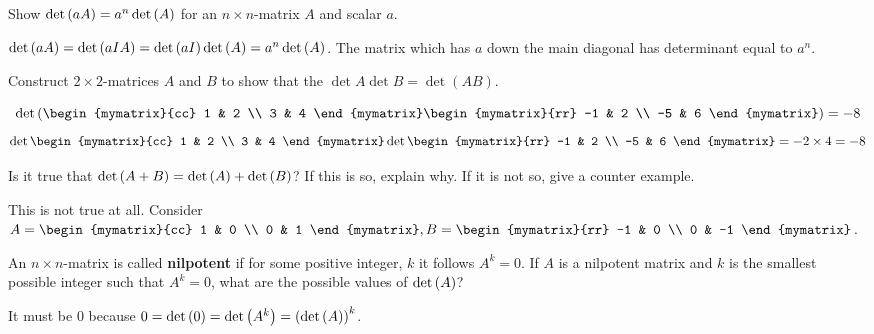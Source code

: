 \begin{enumialphparenastyle}
\begin{ex} Show $\det \left(aA\right) =a^{n}\det \left(A\right) $ for an $n \times n $-matrix $A
$ and scalar $a$. 
\begin{sol}
$\det \left(aA\right) =\det
\left(aIA\right) =\det \left(aI\right) \det \left(A\right) =a^{n}\det
\left(A\right)$. The matrix which has $a$ down the main diagonal has
determinant equal to $a^{n}$.
\end{sol}
\end{ex}


\begin{ex} Construct $2\times 2$-matrices $A$ and $B$ to show that the
$\det A \det B = \det (AB)$. 
\begin{sol}
\begin{equation*}
\det
\tup{\begin{mymatrix}{cc}
1 & 2 \\
3 & 4
\end{mymatrix} \begin{mymatrix}{rr}
-1 & 2 \\
-5 & 6
\end{mymatrix} } = -8
\end{equation*}
\begin{equation*}
\det \begin{mymatrix}{cc}
1 & 2 \\
3 & 4
\end{mymatrix} \det \begin{mymatrix}{rr}
-1 & 2 \\
-5 & 6
\end{mymatrix} = -2 \times 4 = -8
\end{equation*}
\end{sol}
\end{ex}

\begin{ex} Is it true that $\det \left(A+B\right) =\det \left(A\right) +\det
\left(B\right)$? If this is so, explain why. If it is not so,
give a counter example.  
\begin{sol}
This is not true at all. Consider $A=\begin{mymatrix}{cc}
1 & 0 \\
0 & 1
\end{mymatrix} ,B=\begin{mymatrix}{rr}
-1 & 0 \\
0 & -1
\end{mymatrix}$.
\end{sol}
\end{ex}

\begin{ex} An $n\times n$-matrix is called \textbf{nilpotent}
 if for some positive integer, $k$ it follows $A^{k}=0$. If
$A$ is a nilpotent matrix and $k$ is the smallest possible integer such that
$A^{k}=0$, what are the possible values of $\det \left(A\right)$? 
\begin{sol}
It must
be 0 because $0=\det \left(0\right) =\det \left(A^{k}\right) =\left(\det
\left(A\right) \right) ^{k}$.
\end{sol}
\end{ex}


\end{enumialphparenastyle}
